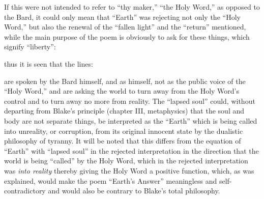 If this were not intended to refer to \enquote{thy maker,} \enquote{the Holy Word,} as opposed to the Bard, it could
only mean that \enquote{Earth} was rejecting not only the \enquote{Holy Word,} but also the renewal of the \enquote{fallen light}
and the \enquote{return} mentioned, while the main purpose of the poem is obviously to ask for these things, which
signify \enquote{liberty}:


\clearpage

\noindent thus it is seen that the lines:


\noindent are spoken by the Bard himself, and as himself, not as the public voice
of the \enquote{Holy Word,} and are asking the world to turn away from the Holy Word's
control and to turn away no more from reality. The \enquote{lapsed soul} could, without departing
from Blake's principle (chapter III, metaphysics) that the soul and body are not separate
things, be interpreted as the \enquote{Earth} which is being called into unreality, or corruption, from
its original innocent state by the dualistic philosophy of tyranny. It will be noted that this
differs from the equation of \enquote{Earth} with \enquote{lapsed soul} in the rejected interpretation in the
direction that the world is being \enquote{called} by the Holy Word, which in the rejected interpretation
was \emph{into reality} thereby giving the Holy Word a positive function, which, as was explained,
would make the poem \enquote{Earth's Answer} meaningless and self-contradictory and would also be contrary
to Blake's total philosophy.

